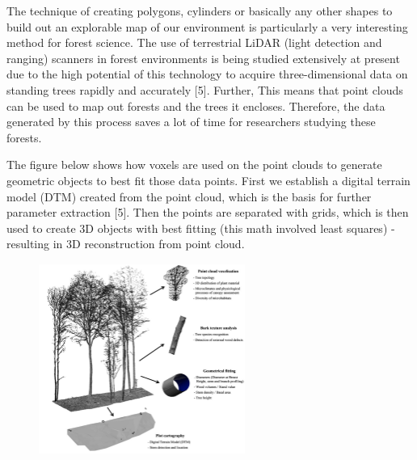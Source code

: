 \documentclass[12pt]{report}
\begin{document}
\vspace{\baselineskip}
The technique of creating polygons, cylinders or basically any other shapes to build out an explorable map of our environment is particularly a very interesting method for forest science. The use of terrestrial LiDAR (light detection and ranging) scanners in forest environments is being studied extensively at present due to the high potential of this technology to acquire three-dimensional data on standing trees rapidly and accurately [5]. Further, This means that point clouds can be used to map out forests and the trees it encloses. Therefore, the data generated by this process saves a lot of time for researchers studying these forests.\par


\vspace{\baselineskip}
The figure below shows how voxels are used on the point clouds to generate geometric objects to best fit those data points. First we establish a digital terrain model (DTM) created from the point cloud, which is the basis for further parameter extraction [5]. Then the points are separated with grids, which is then used to create 3D objects with best fitting (this math involved least squares) - resulting in 3D reconstruction from point cloud.\par


\vspace{\baselineskip}



\begin{figure}[H]
	\begin{Center}
		\includegraphics[width=2.66in,height=2.46in]{./media/image14.png}
	\end{Center}
\end{figure}


\end{document}
